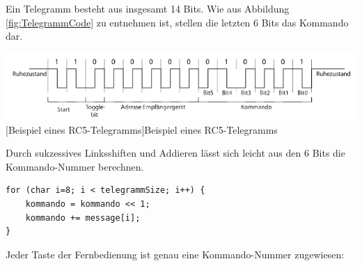 \documentclass[12pt,a4paper,bibliography=totocnumbered,listof=totocnumbered]{scrartcl}
\begin{document}
Ein Telegramm besteht aus insgesamt 14 Bits. Wie aus Abbildung \ref{fig:TelegrammCode} zu entnehmen ist, stellen die letzten 6 Bits das Kommando dar.



\vspace{1em}
\begin{minipage}{\linewidth}
	\centering
	\includegraphics[width=1.1\linewidth]{img/Telegramm.png}
	[Beispiel eines RC5-Telegramms]{Beispiel eines RC5-Telegramms\footnotemark}
	\label{fig:TelegrammCode}
\end{minipage}

Durch sukzessives Linksshiften und Addieren lässt sich leicht aus den 6 Bits die Kommando-Nummer berechnen.

\vspace{1em}
\begin{lstlisting}[caption=Berechnung der Kommando-Nummer]
for (char i=8; i < telegrammSize; i++) {
	kommando = kommando << 1;
	kommando += message[i];
}
\end{lstlisting}


Jeder Taste der Fernbedienung ist genau eine Kommando-Nummer zugewiesen:
\end{document}
